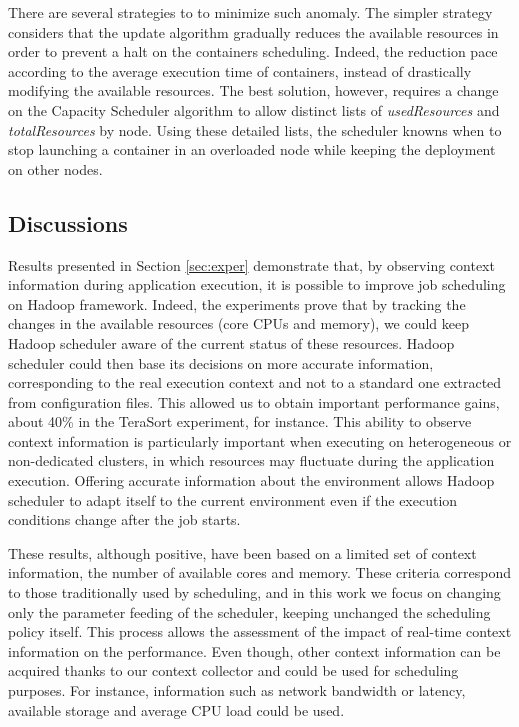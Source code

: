 There are several strategies to to minimize such anomaly. The simpler strategy considers that the update algorithm gradually reduces the available resources in order to prevent a halt on the containers scheduling. Indeed, the reduction pace according to the average execution time of containers, instead of drastically modifying the available resources. The best solution, however, requires a change on the Capacity Scheduler algorithm to allow distinct lists of \textit{usedResources} and \textit{totalResources} by node. Using these detailed lists, the scheduler knowns when to stop launching a container in an overloaded node while keeping the deployment on other nodes.

\subsection{Discussions} \label{sec:disc}
Results presented in Section \ref{sec:exper} demonstrate that, by observing context information during application execution, it is possible to improve job scheduling on Hadoop framework. Indeed, the experiments prove that by tracking the changes in the available resources (core CPUs and memory), we could keep Hadoop scheduler aware of the current status of these resources. Hadoop scheduler could then base its decisions on more accurate information, corresponding to the real execution context and not to a standard one extracted from configuration files. This allowed us to obtain important performance gains, about 40\% in the TeraSort experiment, for instance. This ability to observe context information is particularly important when executing on heterogeneous or non-dedicated clusters, in which resources may fluctuate during the application execution. Offering accurate information about the environment allows Hadoop scheduler to adapt itself to the current environment even if the execution conditions change after the job starts. 

These results, although positive, have been based on a limited set of context information, the number of available cores and memory. These criteria correspond to those traditionally used by  scheduling, and in this work we focus on changing only the parameter feeding of the scheduler, keeping unchanged the scheduling policy itself. This process allows the assessment of the impact of real-time context information on the performance. Even though, other context information can be acquired thanks to our context collector and could be used for scheduling purposes. For instance, information such as network bandwidth or latency, available storage and average CPU load could be used. 

